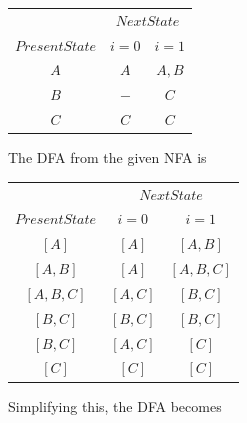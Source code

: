 \vspace*{0.4cm}
\begin{center}
	\begin{tabular}{ccc}
		\hline
		
		\hline
		
		\hline
		
		\hline
		& \multicolumn{2}{c}{$Next State$}\\
		\cline{2-3}
		$Present State$ &  $i=0$ & $i=1$\\
		\hline
		$A$   &   $A$      &  $A,B$ \\
		$B$   &   $-$      &  $C$   \\
		$C$   &   $C$      &  $C$   \\
		\hline
		
		\hline
		
		\hline
		
		\hline
	\end{tabular}
\end{center}

The DFA from the given NFA is

\vspace*{0.4cm}
\begin{center}
	\begin{tabular}{ccc}
		\hline
		
		\hline
		
		\hline
		
		\hline
		& \multicolumn{2}{c}{$Next State$}\\
		\cline{2-3}
		$Present State$ &  $i=0$ & $i=1$\\
		\hline
		$[A]$     &    $[A]$   &    $[A, B]$  \\
		$[A, B]$    &    $[A]$   &  $[A, B, C]$ \\
		$[A, B, C]$   &  $[A, C]$  &   $[B, C]$   \\
		$[B, C]$     &  $[B, C]$  &   $[B, C]$   \\
		$[B, C]$      &  $[A, C]$  &    $[C]$    \\
		$[C]$        &   $[C]$    &    $[C]$    \\
		
	\end{tabular}
\end{center}

Simplifying this, the DFA becomes

